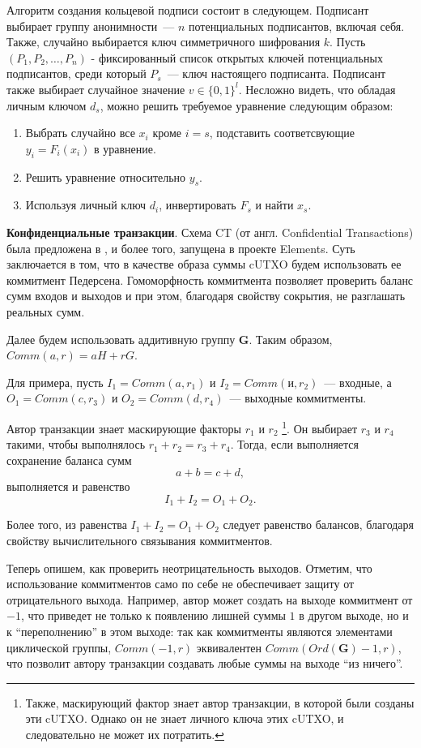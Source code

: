 \documentclass{article}
\begin{document}
Алгоритм создания кольцевой подписи состоит в следующем.
Подписант выбирает группу анонимности~--- $n$ потенциальных подписантов,
включая себя.
Также, случайно выбирается ключ симметричного шифрования $k$.
Пусть $(P_1, P_2, \ldots, P_{n})$ - фиксированный список открытых ключей
потенциальных подписантов, среди который $P_s$~--- ключ настоящего подписанта.
Подписант также выбирает случайное значение $v\in \{0, 1\}^l$.
Несложно видеть, что обладая личным ключом $d_s$,
можно решить требуемое уравнение следующим образом:
\begin{enumerate}
  \item
  Выбрать случайно все $x_i$ кроме $i=s$, подставить соответсвующие $y_i = F_i(x_i)$
  в уравнение.
  \item
  Решить уравнение относительно $y_s$.
  \item
  Используя личный ключ $d_i$, инвертировать $F_s$ и найти $x_s$.
\end{enumerate}

{\bf Конфиденциальные транзакции}.
Схема CT (от англ. Confidential Transactions)
 была предложена в \cite{ct}, и более того, запущена в проекте Elements.
Суть заключается в том, что в качестве образа суммы cUTXO будем использовать ее коммитмент Педерсена.
Гомоморфность коммитмента позволяет проверить баланс сумм входов и выходов и
при этом, благодаря свойству сокрытия, не разглашать реальных сумм.


Далее будем использовать аддитивную группу $\mathbf{G}$.
Таким образом, $Comm(a,r) = aH + rG$.


Для примера, пусть $I_1 = Comm(a, r_1)$ и $I_2 = Comm(и, r_2)$~--- входные,
а $O_1 = Comm(c, r_3)$ и $O_2 = Comm(d, r_4)$~--- выходные коммитменты.

Автор транзакции знает маскирующие факторы $r_1$ и $r_2$
\footnote{Также, маскирующий фактор знает автор транзакции, в которой были созданы эти cUTXO.
Однако он не знает личного ключа этих cUTXO, и следовательно не может их потратить. }.
Он выбирает $r_3$ и $r_4$ такими, чтобы выполнялось $r_1 + r_2 = r_3 + r_4$.
Тогда, если выполняется сохранение баланса сумм
$$a + b = c + d,$$
выполняется и равенство
$$
I_1 + I_2 = O_1 + O_2.
$$

Более того, из равенства $I_1 + I_2 = O_1 + O_2$ следует равенство балансов,
благодаря свойству вычислительного связывания коммитментов.

Теперь опишем, как проверить неотрицательность выходов.
Отметим, что использование коммитментов само по себе
не обеспечивает защиту от отрицательного выхода.
Например, автор может создать на выходе коммитмент от $-1$,
что приведет не только к появлению лишней суммы $1$ в другом выходе,
но и к ``переполнению'' в этом выходе: так как коммитменты являются
элементами циклической группы, $Comm(-1, r)$ эквивалентен $Comm(Ord(\mathbf{G}) - 1, r)$,
что позволит автору транзакции создавать любые суммы на выходе ``из ничего''.
\end{document}
